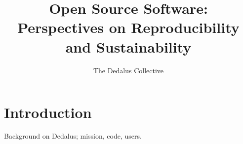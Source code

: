 \documentclass{paper}
\title{Open Source Software: Perspectives on Reproducibility and Sustainability}
\author{The Dedalus Collective}
\begin{document}
\maketitle

\section{Introduction}
\label{sec:intro}

Background on Dedalus; mission, code, users.
\end{document}
